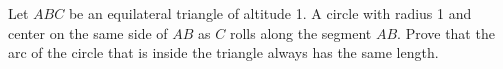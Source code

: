 Let $ABC$ be an equilateral triangle of altitude 1.  A circle with radius 1 and center on the same side of $AB$ as $C$ rolls along the segment $AB$.  Prove that the arc of the circle that is inside the triangle always has the same length.